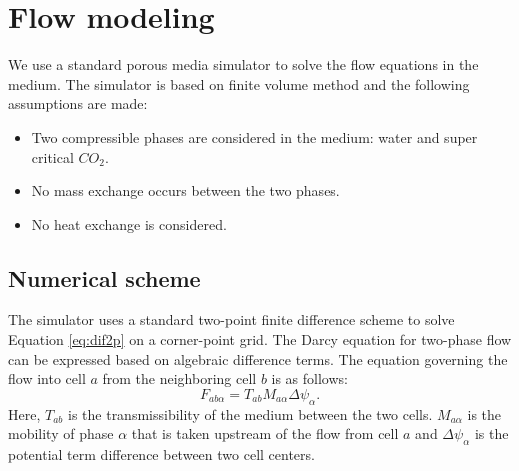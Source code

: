 

\section{Flow modeling}
\label{sec:FolowModeling}

We use a standard porous media simulator \cite{sis2007eclipse} to solve the flow equations in the
medium. The simulator is based on finite volume method and the following
assumptions are made:

\begin{itemize}

  \item Two compressible phases are considered in the medium: water and super
critical ${CO}_2$.
  \item No mass exchange occurs between the two phases.
  \item No heat exchange is considered.
 
\end{itemize}

\subsection{Numerical scheme}

The simulator uses a standard two-point finite difference scheme to solve
Equation \ref{eq:dif2p} on a corner-point grid. The Darcy equation for two-phase flow can be expressed based on algebraic difference terms. The equation governing the flow into cell $a$ from the
neighboring cell $b$ is as follows:
\begin{equation}
 F_{ab\alpha}=T_{ab}M_{a\alpha}\Delta \psi_{\alpha}.
\label{eq:eclF}
\end{equation} Here, $T_{ab}$ is the transmissibility of the medium between the two cells. $M_{a\alpha}$ is the mobility of phase $\alpha$ that is taken upstream of the flow from cell ${a}$ and $\Delta \psi_{\alpha}$ is the potential term difference between two cell centers. 


